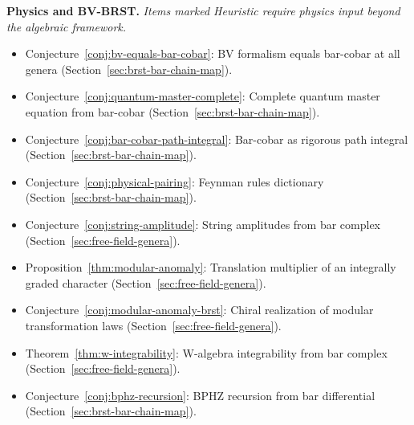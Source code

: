 \smallskip
\noindent\textbf{Physics and BV-BRST.}
\emph{Items marked Heuristic require physics input beyond the algebraic framework.}

\begin{itemize}[nosep]
\item Conjecture~\ref{conj:bv-equals-bar-cobar}:
  BV formalism equals bar-cobar at all genera
  (Section~\ref{sec:brst-bar-chain-map}).
\item Conjecture~\ref{conj:quantum-master-complete}:
  Complete quantum master equation from bar-cobar
  (Section~\ref{sec:brst-bar-chain-map}).
\item Conjecture~\ref{conj:bar-cobar-path-integral}:
  Bar-cobar as rigorous path integral
  (Section~\ref{sec:brst-bar-chain-map}).
\item Conjecture~\ref{conj:physical-pairing}:
  Feynman rules dictionary
  (Section~\ref{sec:brst-bar-chain-map}).
\item Conjecture~\ref{conj:string-amplitude}:
  String amplitudes from bar complex
  (Section~\ref{sec:free-field-genera}).
\item Proposition~\ref{thm:modular-anomaly}:
  Translation multiplier of an integrally graded character
  (Section~\ref{sec:free-field-genera}).
\item Conjecture~\ref{conj:modular-anomaly-brst}:
  Chiral realization of modular transformation laws
  (Section~\ref{sec:free-field-genera}).
\item Theorem~\ref{thm:w-integrability}:
  W-algebra integrability from bar complex
  (Section~\ref{sec:free-field-genera}).
\item Conjecture~\ref{conj:bphz-recursion}:
  BPHZ recursion from bar differential
  (Section~\ref{sec:brst-bar-chain-map}).
\end{itemize}

